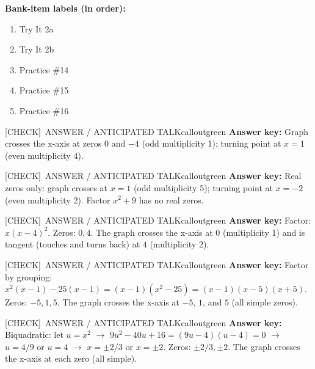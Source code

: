 \documentclass[11pt]{article}
\newcommand{\IconCheck}{[CHECK]}
\newcommand{\teacheranswerbox}[2]{%
  \begin{callout}{#1}{calloutgreen}
  #2
  \end{callout}
}
\begin{document}
\textbf{Bank-item labels (in order):}
\begin{enumerate}[leftmargin=1.6em,itemsep=2pt,topsep=2pt]
  \item Try It 2a
  \item Try It 2b
  \item Practice \#14
  \item Practice \#15
  \item Practice \#16
\end{enumerate}


\teacheranswerbox{\IconCheck\ ANSWER / ANTICIPATED TALK}{%
\textbf{Answer key:} Graph crosses the x-axis at zeros \(0\) and \(-4\) (odd multiplicity 1); turning point at \(x=1\) (even multiplicity 4).
}


\teacheranswerbox{\IconCheck\ ANSWER / ANTICIPATED TALK}{%
\textbf{Answer key:} Real zeros only: graph crosses at \(x=1\) (odd multiplicity 5); turning point at \(x=-2\) (even multiplicity 2). Factor \(x^2+9\) has no real zeros.
}


\teacheranswerbox{\IconCheck\ ANSWER / ANTICIPATED TALK}{%
\textbf{Answer key:} Factor: \(x(x-4)^2\). Zeros: \(0, 4\). The graph crosses the x-axis at \(0\) (multiplicity 1) and is tangent (touches and turns back) at \(4\) (multiplicity 2).
}


\teacheranswerbox{\IconCheck\ ANSWER / ANTICIPATED TALK}{%
\textbf{Answer key:} Factor by grouping: \(x^2(x-1)-25(x-1)=(x-1)(x^2-25)=(x-1)(x-5)(x+5)\). Zeros: \(-5, 1, 5\). The graph crosses the x-axis at \(-5\), \(1\), and \(5\) (all simple zeros).
}


\teacheranswerbox{\IconCheck\ ANSWER / ANTICIPATED TALK}{%
\textbf{Answer key:} Biquadratic: let \(u=x^2\) \(\rightarrow\) \(9u^2-40u+16=(9u-4)(u-4)=0\) \(\rightarrow\) \(u=4/9\) or \(u=4\) \(\rightarrow\) \(x=\pm 2/3\) or \(x=\pm 2\). Zeros: \(\pm 2/3, \pm 2\). The graph crosses the x-axis at each zero (all simple).
}
\end{document}
